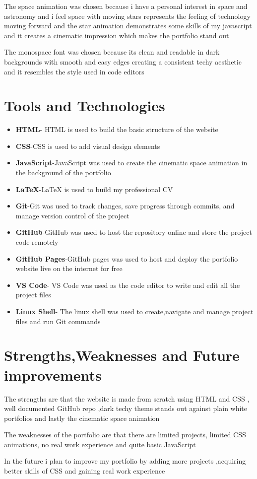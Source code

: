 \documentclass{article}
\begin{document}
The space animation was chosen because i have a personal interest in space and astronomy and i feel space with moving stars represents the feeling of technology moving forward and the star animation demonstrates some skills of my javascript and it creates a cinematic impression which makes the portfolio stand out 

The monospace font was chosen because its clean and readable in dark backgrounds with smooth and easy edges creating a consistent techy aesthetic and it resembles the style used in code editors
\newpage
\section{Tools and Technologies}
\begin{itemize}
    \item \textbf{HTML}- HTML is used to build the basic structure of the website 
    \item \textbf{CSS}-CSS is used to add visual design  elements 
    \item \textbf{JavaScript}-JavaScript was used to create the cinematic space animation in the background of the portfolio 
    \item \textbf{LaTeX}-LaTeX is used to build my professional CV 
    \item \textbf{Git}-Git was used to track changes, save progress through commits, and manage version control of the project 
    \item \textbf{GitHub}-GitHub was used to host the repository online and store the project code remotely
    \item \textbf{GitHub Pages}-GitHub pages was used to host and deploy the portfolio website live on the internet for free
    \item \textbf{VS Code}- VS Code was used as the code editor to write and edit all the project files 
    \item \textbf{Linux Shell}- The linux shell was used to create,navigate and manage project files and run Git commands
\end{itemize}
\section{Strengths,Weaknesses and Future improvements}

The strengths are that the website is made from scratch using HTML and CSS , well documented GitHub repo ,dark techy theme stands out against plain white portfolios and lastly the cinematic space animation

The weaknesses of the portfolio are that there are limited projects, limited CSS animations, no real work experience and quite basic JavaScript

In the future i plan to improve my portfolio by adding more projects ,acquiring better skills of CSS and gaining real work experience 
\end{document}
